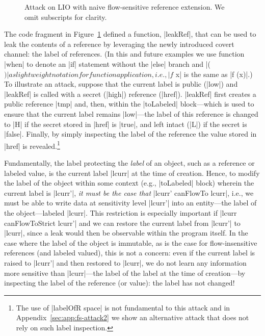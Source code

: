 \begin{figure}[t]
\small
{}
\cut{$}
\caption{Attack on LIO with naive flow-sensitive reference extension. We omit
subscripts for clarity.  \label{fig:fs-attack}}
\end{figure}

The code fragment in Figure~\ref{fig:fs-attack} defined a function,
|leakRef|, that can be used to leak the contents of a reference by
leveraging the newly introduced covert channel: the label of references.
%
(In this and future examples we use function |when| to denote an |if|
statement without the |else| branch and |($)| as lightweight notation
for function application, i.e., |f $ x| is the same as |f (x)|.)
%
To illustrate an attack, suppose that the current label is public
(|low|) and |leakRef| is called with a secret (|high|) reference
(|href|).
%
|leakRef| first creates a public reference |tmp| and, then, within the
|toLabeled| block---which is used to ensure that the current label remains
|low|---the label of this reference is changed to |H| if the secret stored in
|href| is |true|, and left intact (|L|) if the secret is |false|.
%
Finally, by simply inspecting the label of the reference the value stored in
|href| is revealed.\footnote{%
The use of |labelOfR space| is not fundamental to this attack and in
Appendix~\ref{sec:app:fs-attack2} we show an alternative attack that
does not rely on such label inspection.
}

Fundamentally, the label protecting the \emph{label} of an object,
such as a reference or labeled value, is the current label |lcurr| at
the time of creation.
%
Hence, to modify the label of the object within some context (e.g., |toLabeled|
block) wherein the current label is |lcurr'|, \emph{it must be the case that} |lcurr'
canFlowTo lcurr|, i.e., we must be able to write data at sensitivity level
|lcurr'| into an entity---the label of the object---labeled |lcurr|.
%
This restriction is especially important if |lcurr canFlowToStrict
lcurr'| and we can restore the current label from |lcurr'| to |lcurr|, 
since a leak would then be observable within the program itself.
%
In the case where the label of the object is immutable, as is the case for
flow-insensitive references (and labeled valued), this is not a concern: even if
the current label is raised to |lcurr'| and then restored to |lcurr|, we do not
learn any information more sensitive than |lcurr|---the label of the label at the
time of creation---by inspecting the label of the reference (or
value): the label has not changed!
%

